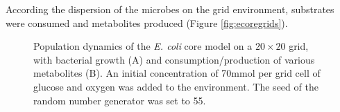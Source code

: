 According the dispersion of the microbes on the grid environment, substrates were consumed and metabolites produced (Figure \hyperref[fig:ecoregrids]{\ref{fig:ecoregrids}}).
\begin{figure}[h!]
  \centering
  \caption{Population dynamics of the \emph{E. coli} core model on a $20\times20$ grid, with bacterial growth (A) and consumption/production of various metabolites (B). An initial concentration of 70\;mmol per grid cell of glucose and oxygen was added to the environment. The seed of the random number generator was set to 55.}
\label{fig:ecoresg}
\end{figure}

